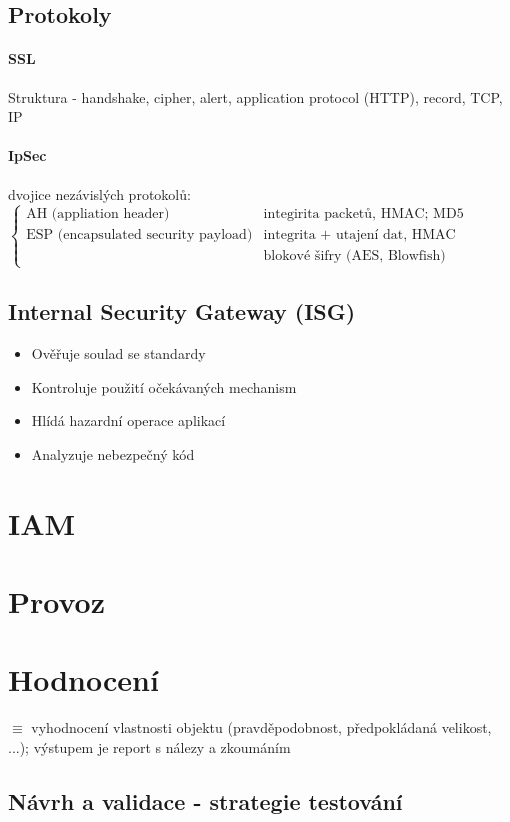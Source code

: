 \documentclass[10pt,a4paper]{article}
\begin{document}
\subsection*{Protokoly}

\paragraph*{SSL}
Struktura - handshake, cipher, alert, application protocol (HTTP), record, TCP, IP

\paragraph*{IpSec} dvojice nezávislých protokolů: $\begin{cases}
    \text{AH (appliation header)} & \text{integirita packetů, HMAC; MD5}\\
    \text{ESP (encapsulated security payload)} & \text{integrita + utajení dat, HMAC} \\
    & \text{blokové šifry (AES, Blowfish)}
\end{cases}$

\subsection*{Internal Security Gateway (ISG)} \begin{itemize}
    \item Ověřuje soulad se standardy
    \item Kontroluje použití očekávaných mechanism
    \item Hlídá hazardní operace aplikací
    \item Analyzuje nebezpečný kód
\end{itemize}

\section{IAM}
\section{Provoz}
\section{Hodnocení}

$\equiv $ vyhodnocení vlastnosti objektu (pravděpodobnost, předpokládaná velikost, ...); výstupem je report s nálezy a zkoumáním

\subsection*{Návrh a validace - strategie testování}
\end{document}
